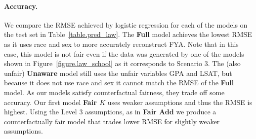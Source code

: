 
\paragraph{Accuracy.}
We compare the RMSE achieved by logistic regression for each of the models on the test set in Table~\ref{table.pred_law}.  The \textbf{Full} model achieves the lowest RMSE as it uses race and sex to more accurately reconstruct FYA. Note that in this case, this model is not fair even if the data was generated by one of the models shown in Figure~\ref{figure.law_school} as it corresponds to Scenario 3. The (also unfair) \textbf{Unaware} model still uses the unfair variables GPA and LSAT, but because it does not use race and sex it cannot match the RMSE of the \textbf{Full} model. As our models satisfy counterfactual fairness, they trade off some accuracy. Our first model \textbf{Fair $K$} uses weaker assumptions and thus the RMSE is highest. Using the Level 3 assumptions, as in \textbf{Fair Add} we produce a counterfactually fair model that trades lower RMSE for slightly weaker assumptions.


